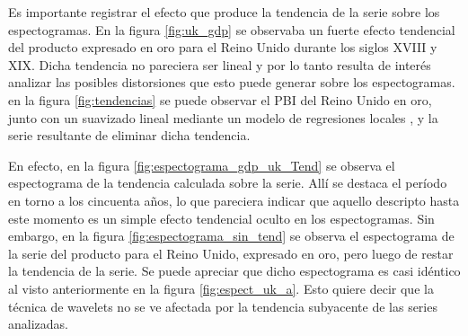 \documentclass[a4paper]{article}
\begin{document}
Es importante registrar el efecto que produce la tendencia de la serie sobre los espectogramas. En la figura \ref{fig:uk_gdp} se observaba un fuerte efecto tendencial del producto expresado en oro para el Reino Unido durante los siglos XVIII y XIX. Dicha tendencia no pareciera ser lineal y por lo tanto resulta de interés analizar las posibles distorsiones que esto puede generar sobre los espectogramas. en la figura \ref{fig:tendencias} se puede observar el PBI del Reino Unido en oro, junto con un suavizado lineal mediante un modelo de regresiones locales \citep{Shyu1992}, y la serie resultante de eliminar dicha tendencia. 

En efecto, en la figura \ref{fig:espectograma_gdp_uk_Tend} se observa el espectograma de la tendencia calculada sobre la serie. Allí se destaca el período en torno a los cincuenta años, lo que pareciera indicar que aquello descripto hasta este momento es un simple efecto tendencial oculto en los espectogramas. Sin embargo, en la figura \ref{fig:espectograma_sin_tend} se observa el espectograma de la serie del producto para el Reino Unido, expresado en oro, pero luego de restar la tendencia de la serie. Se puede apreciar que dicho espectograma es casi idéntico al visto anteriormente en la figura \ref{fig:espect_uk_a}. Esto quiere decir que la técnica de wavelets no se ve afectada por la tendencia subyacente de las series analizadas.
\end{document}
